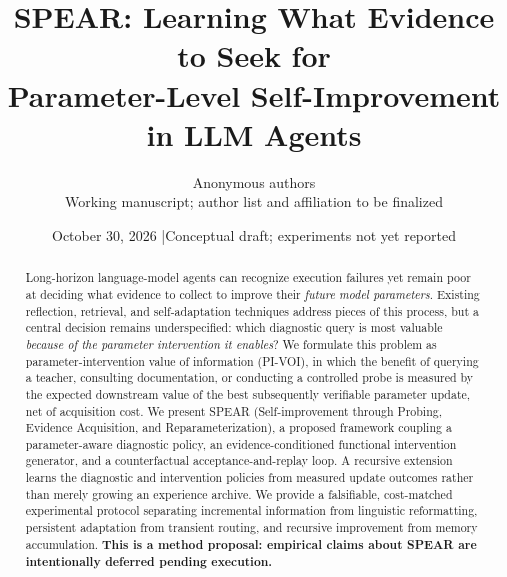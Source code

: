 \documentclass[10pt,twocolumn]{article}
\title{\vspace{-0.5cm}\textbf{SPEAR: Learning What Evidence to Seek for\\
Parameter-Level Self-Improvement in LLM Agents}}
\author{Anonymous authors\\
\small Working manuscript; author list and affiliation to be finalized}
\date{\small October 30, 2026 \quad|\quad Conceptual draft; experiments not yet reported}
\newcommand{\spear}{\textsc{SPEAR}}
\newcommand{\pivoi}{\textsc{PI-VOI}}
\begin{document}
\maketitle
\vspace{-0.4cm}
\begin{abstract}
Long-horizon language-model agents can recognize execution failures yet remain
poor at deciding what evidence to collect to improve their \emph{future model
parameters}. Existing reflection, retrieval, and self-adaptation techniques
address pieces of this process, but a central decision remains underspecified:
which diagnostic query is most valuable \emph{because of the parameter
intervention it enables}? We formulate this problem as parameter-intervention
value of information (\pivoi), in which the benefit of querying a teacher,
consulting documentation, or conducting a controlled probe is measured by the
expected downstream value of the best subsequently verifiable parameter update,
net of acquisition cost. We present \spear{} (Self-improvement through Probing,
Evidence Acquisition, and Reparameterization), a proposed framework coupling
a parameter-aware diagnostic policy, an evidence-conditioned functional
intervention generator, and a counterfactual acceptance-and-replay loop.
A recursive extension learns the diagnostic and intervention policies from
measured update outcomes rather than merely growing an experience archive.
We provide a falsifiable, cost-matched experimental protocol separating
incremental information from linguistic reformatting, persistent adaptation
from transient routing, and recursive improvement from memory accumulation.
\textbf{This is a method proposal: empirical claims about \spear{} are
intentionally deferred pending execution.}
\end{abstract}









\end{document}
